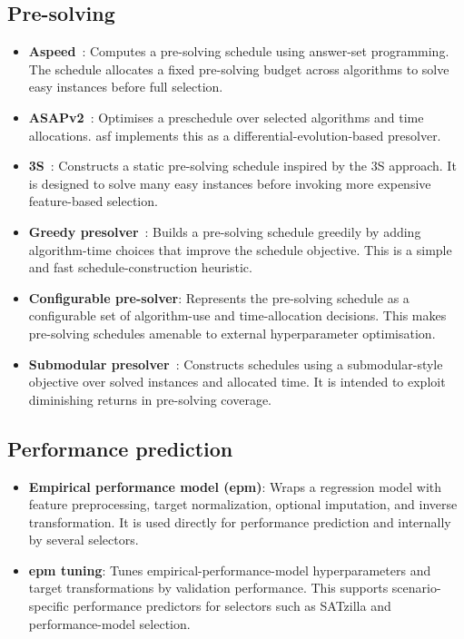 \subsection{Pre-solving}
\begin{itemize}
    \item \textbf{Aspeed}~\citep{HooEtAl12}: Computes a pre-solving schedule using answer-set programming. The schedule allocates a fixed pre-solving budget across algorithms to solve easy instances before full selection.
    \item \textbf{ASAPv2}~\citep{GonEtAl17}: Optimises a preschedule over selected algorithms and time allocations. \Gls{asf} implements this as a differential-evolution-based presolver.
    \item \textbf{3S}~\citep{KadEtAl11}: Constructs a static pre-solving schedule inspired by the 3S approach. It is designed to solve many easy instances before invoking more expensive feature-based selection.
    \item \textbf{Greedy presolver}~\citep{XuEtAl08}: Builds a pre-solving schedule greedily by adding algorithm-time choices that improve the schedule objective. This is a simple and fast schedule-construction heuristic.
    \item \textbf{Configurable pre-solver}: Represents the pre-solving schedule as a configurable set of algorithm-use and time-allocation decisions. This makes pre-solving schedules amenable to external hyperparameter optimisation.
    \item \textbf{Submodular presolver}~\citep{StrEtA08}: Constructs schedules using a submodular-style objective over solved instances and allocated time. It is intended to exploit diminishing returns in pre-solving coverage.
\end{itemize}

\subsection{Performance prediction}
\begin{itemize}
    \item \textbf{Empirical performance model (\gls{epm})}: Wraps a regression model with feature preprocessing, target normalization, optional imputation, and inverse transformation. It is used directly for performance prediction and internally by several selectors.
    \item \textbf{\gls{epm} tuning}: Tunes empirical-performance-model hyperparameters and target transformations by validation performance. This supports scenario-specific performance predictors for selectors such as SATzilla and performance-model selection.
\end{itemize}


